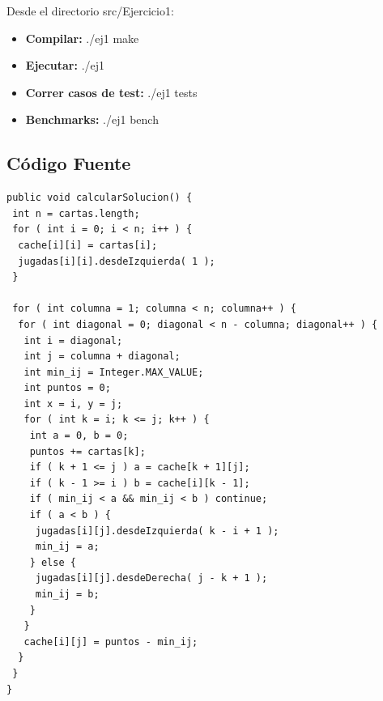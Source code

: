 Desde el directorio src/Ejercicio1:

\begin{itemize}
   \item {\bf Compilar:} ./ej1 make
   \item {\bf Ejecutar:} ./ej1
   \item {\bf Correr casos de test:} ./ej1 tests
   \item {\bf Benchmarks:} ./ej1 bench
\end{itemize}

\subsection{C\'odigo Fuente}
\begin{verbatim}
public void calcularSolucion() {
 int n = cartas.length;
 for ( int i = 0; i < n; i++ ) {
  cache[i][i] = cartas[i];
  jugadas[i][i].desdeIzquierda( 1 );
 }

 for ( int columna = 1; columna < n; columna++ ) {
  for ( int diagonal = 0; diagonal < n - columna; diagonal++ ) {
   int i = diagonal;
   int j = columna + diagonal;
   int min_ij = Integer.MAX_VALUE;
   int puntos = 0;
   int x = i, y = j;
   for ( int k = i; k <= j; k++ ) {
    int a = 0, b = 0;
    puntos += cartas[k];
    if ( k + 1 <= j ) a = cache[k + 1][j];
    if ( k - 1 >= i ) b = cache[i][k - 1];
    if ( min_ij < a && min_ij < b ) continue;
    if ( a < b ) {
     jugadas[i][j].desdeIzquierda( k - i + 1 );
     min_ij = a;
    } else {
     jugadas[i][j].desdeDerecha( j - k + 1 );
     min_ij = b;
    }
   }
   cache[i][j] = puntos - min_ij;
  }
 }
}
\end{verbatim}
